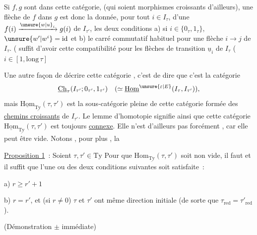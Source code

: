Si $f,g$  sont dans cette catégorie,  (qui soient morphismes croissants d'ailleurs), une flèche de $f$ dans $g$ est donc  la donnée, pour tout $i\in I_\tau$, d'une   $f(i)\xrightarrow{\unsure{w|u}_i}g(i)$ de $I_{\tau'}$,  les deux conditions a) si $i\in\{0_\tau,1_\tau\}$, $\unsure{w'|w^{i}}=\mathrm{id}$ et b) le carré commutatif habituel pour une flèche $i\to j$ de $I_\tau$. ( suffit d'avoir cette compatibilité pour les flèches de transition $\underline{u}_i$ de $I_\tau$ ($i\in[1,\mathrm{long}\,\tau]$

Une autre façon de décrire cette catégorie , c'est de  dire que c'est  la catégorie 
\[
\underline{\mathrm{Ch}}_\tau(I_{\tau'};0_{\tau'},1_{\tau'})
\quad(\simeq\underline{\mathrm{Hom}}^{\unsure{\varepsilon|E}}(I_\tau,I_{\tau'})),
\]
mais $\underline{\mathrm{Hom}}_{\underline{\mathrm{Ty}}}(\tau,\tau')$ est la sous-catégorie pleine de cette catégorie formée des \uline{chemins croissants} de $I_{\tau'}$. Le lemme d'homotopie signifie ainsi que cette catégorie $\underline{\mathrm{Hom}}_{\underline{\mathrm{Ty}}}(\tau,\tau')$ est  toujours \uline{connexe}. Elle n'est d'ailleurs pas forcément , car elle peut être vide. Notons , pour plus , la

\uline{Proposition 1}~: Soient $\tau,\tau'\in\mathrm{Ty}$ Pour que $\mathrm{Hom}_{\underline{\mathrm{Ty}}}(\tau,\tau')$ soit non vide, il faut et il suffit que l'une ou   des deux conditions suivantes soit satisfaite~:

a) $r\geq r'+1$

b) $r=r'$, et (si $r\ne0$)  $\tau$ et $\tau'$ ont même direction initiale (de sorte que $\tau_{\mathrm{red}}=\tau'_{\mathrm{red}}$).

(Démonstration $\pm$ immédiate)

